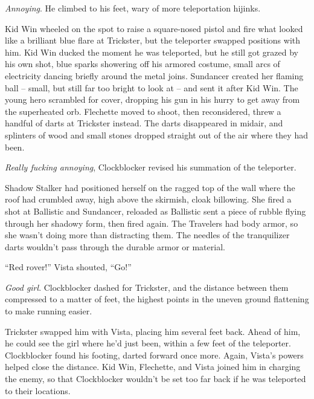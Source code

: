 \emph{Annoying}.  He climbed to his feet, wary of more teleportation hijinks.



Kid Win wheeled on the spot to raise a square-nosed pistol and fire what looked like a brilliant blue flare at Trickster, but the teleporter swapped positions with him.  Kid Win ducked the moment he was teleported, but he still got grazed by his own shot, blue sparks showering off his armored costume, small arcs of electricity dancing briefly around the metal joins.  Sundancer created her flaming ball – small, but still far too bright to look at – and sent it after Kid Win.  The young hero scrambled for cover, dropping his gun in his hurry to get away from the superheated orb.  Flechette moved to shoot, then reconsidered, threw a handful of darts at Trickster instead.  The darts disappeared in midair, and splinters of wood and small stones dropped straight out of the air where they had been.



\emph{Really fucking annoying}, Clockblocker revised his summation of the teleporter.



Shadow Stalker had positioned herself on the ragged top of the wall where the roof had crumbled away, high above the skirmish, cloak billowing.  She fired a shot at Ballistic and Sundancer, reloaded as Ballistic sent a piece of rubble flying through her shadowy form, then fired again.  The Travelers had body armor, so she wasn't doing more than distracting them.  The needles of the tranquilizer darts wouldn't pass through the durable armor or material.



``Red rover!'' Vista shouted, ``Go!''



\emph{G}\emph{ood girl}.  Clockblocker dashed for Trickster, and the distance between them compressed to a matter of feet, the highest points in the uneven ground flattening to make running easier.



Trickster swapped him with Vista, placing him several feet back.  Ahead of him, he could see the girl where he'd just been, within a few feet of the teleporter.  Clockblocker found his footing, darted forward once more.  Again, Vista's powers helped close the distance.  Kid Win, Flechette, and Vista joined him in charging the enemy, so that Clockblocker wouldn't be set too far back if he was teleported to their locations.



